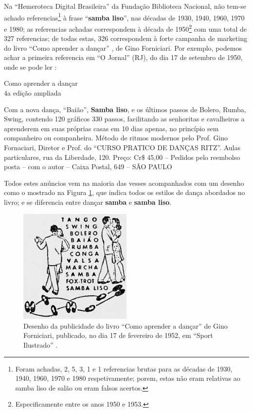 
Na ``Hemeroteca Digital Brasileira'' da Fundação Biblioteca Nacional,
não tem-se achado referencias\footnote{ Foram achadas,
2, 5, 3, 1 e 1 referencias brutas para as décadas de 1930, 1940, 1960, 1970 e 1980 respetivamente;
porem, estas não eram relativas ao samba liso de salão ou eram falsos acertos.} 
à frase ``\textbf{samba liso}'', nas décadas de 1930, 1940, 1960, 1970 e 1980;
as referencias achadas correspondem à década de 1950\footnote{Especificamente entre os anos 1950 e 1953.}  
com uma total de 327 referencias;
de todas estas, 326 correspondem à forte campanha 
de marketing do livro
``Como aprender a dançar'' , 
de Gino Forniciari. 
Por exemplo, podemos achar a primeira referencia em ``O Jornal'' (RJ),
do dia 17 de setembro de 1950, onde se pode ler \cite[3ra seção pp. 9]{jornalanunciodanca1}:
\begin{citando}
\begin{center}
Como aprender a dançar\\
4a edição ampliada
\end{center}
Com a nova dança, ``Baião'', \textbf{Samba liso}, e os
últimos passos de Bolero, Rumba, Swing, contendo
120 gráficos 330 passos, facilitando as senhoritas 
e cavalheiros a aprenderem em suas próprias 
casas em 10 dias apenas, no princípio sem
companheiro ou companheira. Método de ritmos modernos
pelo Prof. Gino Fornaciari, 
Diretor e Prof. do ``CURSO PRATICO DE DANÇAS RITZ''.
Aulas particulares, rua da Liberdade, 120.
Preço: Cr\$ 45,00 -- Pedidos pelo reembolso posta 
-- com o autor -- Caixa Postal, 649 -- SÃO PAULO 
\end{citando}
Todos estes anúncios vem na maioria das vesses acompanhados com um desenho como
o mostrado na Figura \ref{fig:desenholivrodanca1}, que indica todos os estilos de dança abordados no livro;
e se diferencia entre dançar \textbf{samba} e \textbf{samba liso}.
\begin{figure}[h]
  \centering
    \includegraphics[width=0.5\textwidth]{chapters/cap-historia-dancasamba/comoaprenderdancar.jpg}
  \caption{Desenho da publicidade do livro ``Como aprender a dançar'' de Gino Forniciari,
publicado, no dia 17 de fevereiro de 1952, em ``Sport Ilustrado'' \cite[pp. 22]{sportlivropublidanca}.}
\label{fig:desenholivrodanca1}
\end{figure}



